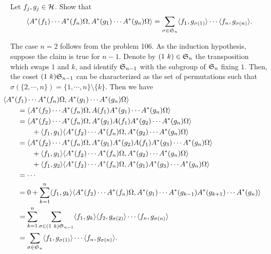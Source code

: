 \documentclass{../../../small}
\begin{document}
\begin{prb}
Let $f_j,g_j\in\mathcal{H}$.
Show that
\[\langle A^*(f_1)\cdots A^*(f_n)\Omega,A^*(g_1)\cdots A^*(g_n)\Omega\rangle=\sum_{\sigma\in\mathfrak{S}_n}\langle f_1,g_{\sigma(1)}\rangle\cdots\langle f_n,g_{\sigma(n)}\rangle.\]
\end{prb}
\begin{sol}
The case $n=2$ follows from the problem 106.
As the induction hypothesis, suppose the claim is true for $n-1$.
Denote by $(1\ k)\in\mathfrak{S}_n$ the transposition which swaps $1$ and $k$, and identify $\mathfrak{S}_{n-1}$ with the subgroup of $\mathfrak{S}_n$ fixing $1$.
Then, the coset $(1\ k)\mathfrak{S}_{n-1}$ can be characterized as the set of permutations such that $\sigma(\{2,\cdots,n\})=\{1,\cdots,n\}\setminus\{k\}$.
Then we have
\begin{align*}
&\hspace{-2em}\<A^*(f_1)\cdots A^*(f_n)\Omega,A^*(g_1)\cdots A^*(g_n)\Omega\>\\
&=\<A^*(f_2)\cdots A^*(f_n)\Omega,A(f_1)A^*(g_1)\cdots A^*(g_n)\Omega\>\\
&=\<A^*(f_2)\cdots A^*(f_n)\Omega,A^*(g_1)A(f_1)A^*(g_2)\cdots A^*(g_n)\Omega\>\\
&\qquad+\<f_1,g_1\>\<A^*(f_2)\cdots A^*(f_n)\Omega,A^*(g_2)\cdots A^*(g_n)\Omega\>\\
&=\<A^*(f_2)\cdots A^*(f_n)\Omega,A^*(g_1)A^*(g_2)A(f_1)A^*(g_3)\cdots A^*(g_n)\Omega\>\\
&\qquad+\<f_1,g_1\>\<A^*(f_2)\cdots A^*(f_n)\Omega,A^*(g_2)\cdots A^*(g_n)\Omega\>\\
&\qquad+\<f_1,g_2\>\<A^*(f_2)\cdots A^*(f_n)\Omega,A^*(g_1)A^*(g_3)\cdots A^*(g_n)\Omega\>\\
&=\cdots\\
&=0+\sum_{k=1}^n\<f_1,g_k\>\<A^*(f_2)\cdots A^*(f_n)\Omega,A^*(g_1)\cdots A^*(g_{k-1})A^*(g_{k+1})\cdots A^*(g_n)\>\\
&=\sum_{k=1}^n\sum_{\sigma\in(1\ k)\fS_{n-1}}\<f_1,g_k\>\<f_2,g_{\sigma(2)}\>\cdots\<f_n,g_{\sigma(n)}\>\\
&=\sum_{\sigma\in\fS_n}\<f_1,g_{\sigma(1)}\>\cdots\<f_n,g_{\sigma(n)}\>.
\end{align*}
\end{sol}
\end{document}
